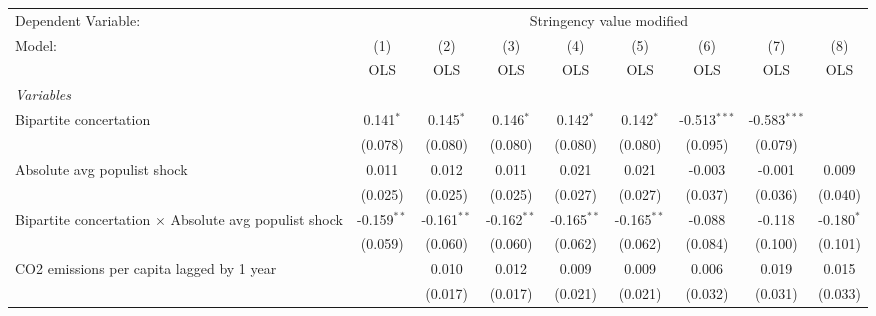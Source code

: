 
\begingroup
\centering
\begin{tabular}{lcccccccc}
   \toprule
   Dependent Variable: & \multicolumn{8}{c}{Stringency value modified}\\
   Model:                                                       & (1)           & (2)           & (3)           & (4)           & (5)           & (6)            & (7)            & (8)\\  
                                                                &  OLS          & OLS           & OLS           & OLS           & OLS           & OLS            & OLS            & OLS\\  
   \midrule
   \emph{Variables}\\
   Bipartite concertation                                       & 0.141$^{*}$   & 0.145$^{*}$   & 0.146$^{*}$   & 0.142$^{*}$   & 0.142$^{*}$   & -0.513$^{***}$ & -0.583$^{***}$ &   \\   
                                                                & (0.078)       & (0.080)       & (0.080)       & (0.080)       & (0.080)       & (0.095)        & (0.079)        &   \\   
   Absolute avg populist shock                                  & 0.011         & 0.012         & 0.011         & 0.021         & 0.021         & -0.003         & -0.001         & 0.009\\   
                                                                & (0.025)       & (0.025)       & (0.025)       & (0.027)       & (0.027)       & (0.037)        & (0.036)        & (0.040)\\   
   Bipartite concertation $\times$ Absolute avg populist shock  & -0.159$^{**}$ & -0.161$^{**}$ & -0.162$^{**}$ & -0.165$^{**}$ & -0.165$^{**}$ & -0.088         & -0.118         & -0.180$^{*}$\\   
                                                                & (0.059)       & (0.060)       & (0.060)       & (0.062)       & (0.062)       & (0.084)        & (0.100)        & (0.101)\\   
   CO2 emissions per capita lagged by 1 year                    &               & 0.010         & 0.012         & 0.009         & 0.009         & 0.006          & 0.019          & 0.015\\   
                                                                &               & (0.017)       & (0.017)       & (0.021)       & (0.021)       & (0.032)        & (0.031)        & (0.033)\\   

\end{tabular}
